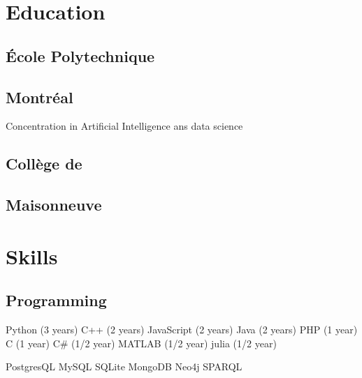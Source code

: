 \documentclass[]{deedy-resume-openfont}
\begin{document}
\begin{minipage}[t]{0.33\textwidth} 


\section{Education} 

\subsection{École Polytechnique}
\subsection{Montréal}
Concentration in Artificial Intelligence ans data science\\
\sectionsep

\subsection{Collège de}
\subsection{Maisonneuve}
\sectionsep



\section{Skills}
\subsection{Programming}
Python (3 years) \textbullet{}  C++ (2 years)\textbullet{} JavaScript (2 years) \textbullet{} Java (2 years) \textbullet{} PHP (1 year) \textbullet{} C (1 year) \textbullet{} C\# (1/2 year) \textbullet{} MATLAB (1/2 year) \textbullet{} julia (1/2 year)\\

\hfill

PostgresQL \textbullet{} MySQL \textbullet{} SQLite \textbullet{} MongoDB  \textbullet{} Neo4j \textbullet{} SPARQL\\


\end{minipage}
\end{document}
